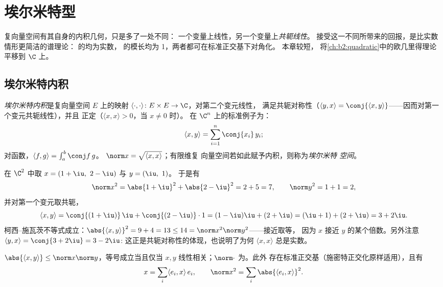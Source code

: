 \chapter{埃尔米特型}\label{ch:b2:hermitian}

复向量空间有其自身的内积几何，只是多了一处不同：
一个变量上线性，另一个变量上\emph{共轭线性}。
接受这一不同所带来的回报，是比实数情形更简洁的谱理论：
的均为实数，
的模长均为 1，两者都可在标准正交基下对角化。
本章较短，
将\cref{ch:b2:quadratic}中的欧几里得理论平移到 $\C$ 上。

\section{埃尔米特内积}

\begin{definition}\label{def:b2:hermitian:def}
\emph{埃尔米特内积}是复向量空间
$E$ 上的映射 $\langle\cdot,\cdot\rangle
\colon E \times E \to \C$，对第二个变元线性，
满足共轭对称性（$\langle y, x\rangle = \conj{\langle x,
y\rangle}$——因而对第一个变元共轭线性），并且
正定（$\langle x, x\rangle > 0$，当 $x \neq 0$ 时）。
在 $\C^n$ 上的标准例子为：
\[
\langle x, y \rangle = \sum_{i=1}^{n} \conj{x_i}\, y_i ;
\]
对函数，$\langle f, g\rangle = \int_a^b \conj
f\,g$。 $\norm x = \sqrt{\langle x,x\rangle}$；有限维复
向量空间若如此赋予内积，则称为\emph{埃尔米特
空间}。
\end{definition}

\begin{example}[初步计算]\label{ex:b2:hermitian:firstcomp}
在 $\C^2$ 中取 $x = (1+\iu,\ 2-\iu)$ 与 $y = (\iu,\ 1)$。
于是有
\[
\norm x^2 = \abs{1+\iu}^2 + \abs{2-\iu}^2 = 2 + 5 = 7,
\qquad
\norm y^2 = 1 + 1 = 2,
\]
并对第一个变元取共轭，
\[
\langle x, y\rangle
= \conj{(1+\iu)}\,\iu + \conj{(2-\iu)}\cdot1
= (1-\iu)\iu + (2+\iu)
= (\iu + 1) + (2 + \iu) = 3 + 2\iu .
\]
柯西–施瓦茨不等式成立：$\abs{\langle x, y\rangle}^2 = 9 +
4 = 13 \leq 14 = \norm x^2\norm y^2$——接近取等，
因为 $x$ 接近 $y$ 的某个倍数。另外注意
$\langle y, x\rangle = \conj{3 + 2\iu} = 3 - 2\iu$:
这正是共轭对称性的体现，也说明了为何 $\langle x,
x\rangle$ 总是实数。
\end{example}

\begin{theorem}\label{thm:b2:hermitian:cs}
$\abs{\langle x, y\rangle} \leq \norm x \norm y$，等号成立当且仅当
$x, y$ 线性相关；$\norm\cdot$ 为。此外
存在标准正交基（施密特正交化原样适用），且有
\[
x = \sum_i \langle e_i, x\rangle\, e_i,
\qquad
\norm x^2 = \sum_i \abs{\langle e_i, x\rangle}^2 .
\]
\end{theorem}

